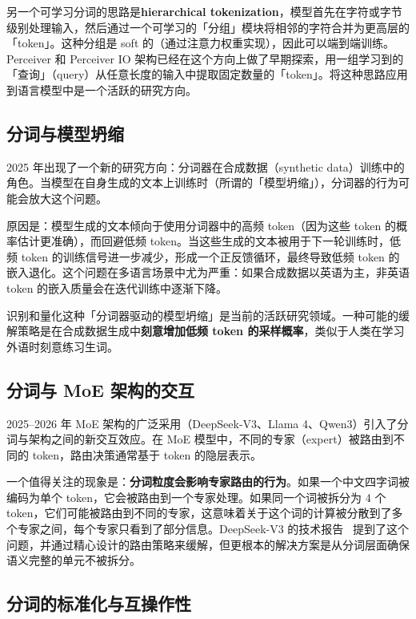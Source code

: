 另一个可学习分词的思路是\textbf{hierarchical tokenization}，模型首先在字符或字节级别处理输入，然后通过一个可学习的「分组」模块将相邻的字符合并为更高层的「token」。这种分组是 soft 的（通过注意力权重实现），因此可以端到端训练。Perceiver 和 Perceiver IO 架构已经在这个方向上做了早期探索，用一组学习到的「查询」（query）从任意长度的输入中提取固定数量的「token」。将这种思路应用到语言模型中是一个活跃的研究方向。

\subsection{分词与模型坍缩}

2025 年出现了一个新的研究方向：分词器在合成数据（synthetic data）训练中的角色。当模型在自身生成的文本上训练时（所谓的「模型坍缩」），分词器的行为可能会放大这个问题。

原因是：模型生成的文本倾向于使用分词器中的高频 token（因为这些 token 的概率估计更准确），而回避低频 token。当这些生成的文本被用于下一轮训练时，低频 token 的训练信号进一步减少，形成一个正反馈循环，最终导致低频 token 的嵌入退化。这个问题在多语言场景中尤为严重：如果合成数据以英语为主，非英语 token 的嵌入质量会在迭代训练中逐渐下降。

识别和量化这种「分词器驱动的模型坍缩」是当前的活跃研究领域。一种可能的缓解策略是在合成数据生成中\textbf{刻意增加低频 token 的采样概率}，类似于人类在学习外语时刻意练习生词。

\subsection{分词与 MoE 架构的交互}

2025--2026 年 MoE 架构的广泛采用（DeepSeek-V3、Llama 4、Qwen3）引入了分词与架构之间的新交互效应。在 MoE 模型中，不同的专家（expert）被路由到不同的 token，路由决策通常基于 token 的隐层表示。

一个值得关注的现象是：\textbf{分词粒度会影响专家路由的行为}。如果一个中文四字词被编码为单个 token，它会被路由到一个专家处理。如果同一个词被拆分为 4 个 token，它们可能被路由到不同的专家，这意味着关于这个词的计算被分散到了多个专家之间，每个专家只看到了部分信息。DeepSeek-V3 的技术报告~\cite{deepseekv3} 提到了这个问题，并通过精心设计的路由策略来缓解，但更根本的解决方案是从分词层面确保语义完整的单元不被拆分。

\subsection{分词的标准化与互操作性}

